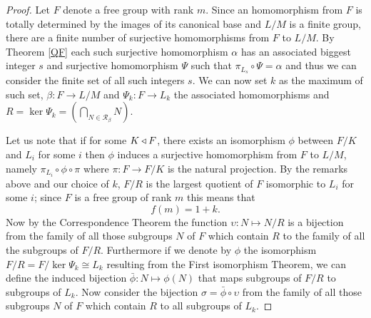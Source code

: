 \begin{proof}
    Let $F$ denote a free group with rank $m$. Since an homomorphism from $F$ is totally determined by the images of its canonical base and $L/M$ is a finite group, there are a finite number of surjective homomorphisms from $F$ to $L/M$. By Theorem \ref{QF} each such surjective homomorphism $\alpha$ has an associated biggest integer $s$ and surjective homomorphism $\Psi$ such that $\pi_{L_s} \circ \Psi = \alpha$ and thus we can consider the finite set of all such integers $s$. We can now set $k$ as the maximum of such set, $\beta \colon F \rightarrow L/M$ and $\Psi_k \colon F \rightarrow L_k$ the associated homomorphisms and $R = \ker \Psi_k = (\bigcap_{N \in \mathscr{R}_\beta}N)$.
    
    Let us note that if for some $K \triangleleft F$, there exists an isomorphism $\phi$ between $F/K$ and $L_i$ for some $i$ then $\phi$ induces a surjective homomorphism from $F$ to $L/M$, namely $\pi_{L_i} \circ \phi \circ \pi$ where $\pi \colon F \rightarrow F/K$ is the natural projection.
    By the remarks above and our choice of $k$, $F/R$ is the largest quotient of $F$ isomorphic to $L_i$ for some $i$; since $F$ is a free group of rank $m$ this means that 
    $$
    f(m) = 1 + k.
    $$
    Now by the Correspondence Theorem the function $\upsilon \colon N \mapsto N/R$ is a bijection from the family of all those subgroups $N$ of $F$ which contain $R$ to the family of all the subgroups of $F/R$. Furthermore if we denote by $\phi$ the isomorphism $F/R = F/\ker \Psi_k \cong L_k$ resulting from the First isomorphism Theorem, we can define the induced bijection $\bar{\phi} \colon N \mapsto \phi(N)$ that maps subgroups of $F/R$ to subgroups of $L_k$. Now consider the bijection $\sigma = \bar{\phi} \circ \upsilon$ from the family of all those subgroups $N$ of $F$ which contain $R$ to all subgroups of $L_k$. 
    

\end{proof}
